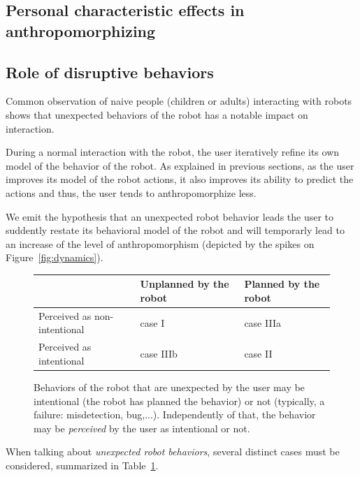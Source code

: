 \documentclass[lettersize, apacite, twoside, HRI]{apa_HRI}
\begin{document}
\subsection{Personal characteristic effects in anthropomorphizing}
\label{sec:8.3}

\subsection{Role of disruptive behaviors}
\label{sec:disruptive}

Common observation of naive people (children or adults) interacting with robots
shows that unexpected behaviors of the robot has a notable impact on
interaction.

During a normal interaction with the robot, the user iteratively refine its own
model of the behavior of the robot. As explained in previous sections, as the
user improves its model of the robot actions, it also improves its ability to predict
the actions and thus, the user tends to anthropomorphize less.

We emit the hypothesis that an unexpected robot behavior leads the user to
suddently restate its behavioral model of the robot and will temporarly lead to
an increase of the level of anthropomorphism (depicted by the spikes on
Figure~\ref{fig:dynamics}).

\begin{figure}
\begin{center}
    \begin{tabular}{ | >{\centering\arraybackslash}m{1.5cm} | >{\centering\arraybackslash}m{2cm} | >{\centering\arraybackslash}m{2cm} |}
    \hline
     & Unplanned by the robot & Planned by the robot \\ \hline
    Perceived as non-intentional & case I  & case IIIa  \\ \hline
    Perceived as intentional &  case IIIb & case II  \\ \hline
    \end{tabular}
\end{center}
\caption{
    Behaviors of the robot that are unexpected by the user may be intentional
    (the robot has planned the behavior) or not (typically, a failure:
    misdetection, bug,...). Independently of that, the behavior may be
    \emph{perceived} by the user as intentional or not.}
\label{fig:perceptionUnexpectedBehavior}
\end{figure}

When talking about \emph{unexpected robot behaviors}, several distinct cases
must be considered, summarized in Table~\ref{fig:perceptionUnexpectedBehavior}.
\end{document}
